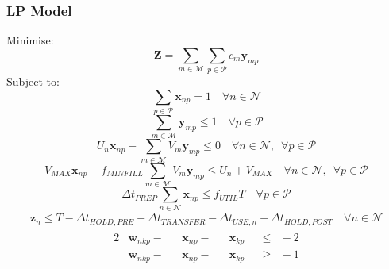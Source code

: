 \documentclass{beamer}
\begin{document}
\begin{frame}
\frametitle{LP Model}
\tiny
Minimise:
\begin{equation*}
    \boldsymbol{Z} = \sum_{m \in \mathcal{M}} \sum_{p \in \mathcal{P}} c_m
    \boldsymbol{y}_{mp}
\end{equation*}
Subject to:
\begin{equation*}
    \sum_{p \in \mathcal{P}} \boldsymbol{x}_{np} = 1 \quad \forall n \in 
    \mathcal{N}
\end{equation*}
\begin{equation*}
    \sum_{m \in \mathcal{M}} \boldsymbol{y}_{mp} \le 1 \quad \forall p \in 
    \mathcal{P}
\end{equation*}
\begin{equation*}
    U_{n} \boldsymbol{x}_{np} - \sum_{m \in \mathcal{M}} V_{m} 
    \boldsymbol{y}_{mp} \le 0 \quad \forall n \in \mathcal{N}, \enspace 
    \forall p \in \mathcal{P}
\end{equation*}
\begin{equation*}
    V_{\mathit{MAX}} \boldsymbol{x}_{np} + f_{\mathit{MINFILL}} 
    \sum_{m \in \mathcal{M}} V_{m} \boldsymbol{y}_{mp} \le U_{n}
    + V_{\mathit{MAX}} \quad \forall n \in \mathcal{N}, \enspace \forall p \in
    \mathcal{P}
\end{equation*}
\begin{equation*}
    \Delta t_{\mathit{PREP}} \sum_{n \in \mathcal{N}} \boldsymbol{x}_{np} \le
    f_{\mathit{UTIL}} T \quad \forall p \in \mathcal{P}
\end{equation*}
\begin{equation*}
    \begin{aligned}
        \boldsymbol{z}_{n} \le T - \Delta t_{\mathit{HOLD,PRE}}
        - \Delta t_{\mathit{TRANSFER}} - \Delta t_{\mathit{USE},n}
        - \Delta t_{\mathit{HOLD,POST}} \quad \forall n \in \mathcal{N}
    \end{aligned}
\end{equation*}
\begin{equation*}
    \begin{split}
        \begin{alignedat}{11}
            2&\boldsymbol{w}_{nkp} {}-{} &&\boldsymbol{x}_{np}
            {}-{} && \boldsymbol{x}_{kp} {}&&\le{} &{}-{} 2\\
            &\boldsymbol{w}_{nkp} {}-{} &&\boldsymbol{x}_{np}
            {}-{} && \boldsymbol{x}_{kp} {}&&\ge{} &{}-{} 1\\
        \end{alignedat}

\end{split}
\end{equation*}
\end{frame}
\end{document}
